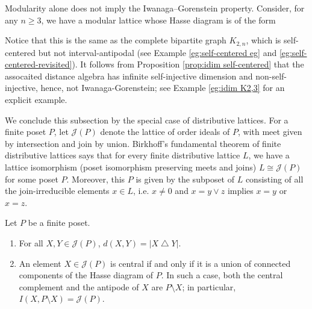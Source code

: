 \documentclass[a4paper,leqno]{amsart}
\begin{document}
\begin{rmk}\label{rmk:modular-non-IG}
Modularity alone does not imply the Iwanaga--Gorenstein property. 
Consider, for any $n\ge 3$, we have a modular lattice whose Hasse diagram is of the form
\begin{center}
\end{center}
Notice that this is the same as the complete bipartite graph $K_{2,n}$, which is self-centered but not interval-antipodal (see Example \ref{eg:self-centered eg} and \ref{eg:self-centered-revisited}). 
It follows from Proposition \ref{prop:idim self-centered} that the assocaited distance algebra has infinite self-injective dimension and non-self-injective, hence, not Iwanaga-Gorenstein; see Example \ref{eg:idim K2,3} for an explicit example.
\end{rmk}

We conclude this subsection by the special case of distributive lattices.  For a finite poset $P$, let $\mathcal J(P)$ denote the lattice of order ideals of $P$, with meet given by intersection and join by union.
Birkhoff's fundamental theorem of finite distributive lattices says that for every finite distributive lattice $L$, we have a lattice isomorphism (poset isomorphism preserving meets and joins) $L\cong \mathcal J(P)$ for some poset $P$.
Moreover, this $P$ is given by the subposet of $L$ consisting of all the join-irreducible elements $x\in L$, i.e. $x\neq 0$ and $x=y\vee z$ implies $x=y$ or $x=z$.

\begin{cor}\label{cor:J(P)-central}
Let $P$ be a finite poset.
\begin{enumerate}
    \item For all $X,Y\in \mathcal J(P)$, $d(X,Y)=|X\mathbin{\triangle}Y|$.
    \item An element $X\in \mathcal J(P)$ is central if and only if it is a union of connected components of the Hasse diagram of $P$.  In such a case, both the central complement and the antipode
of $X$ are $P\setminus X$; in particular, $I(X,P\setminus X)=\mathcal J(P)$.
\end{enumerate}
\end{cor}
\end{document}
